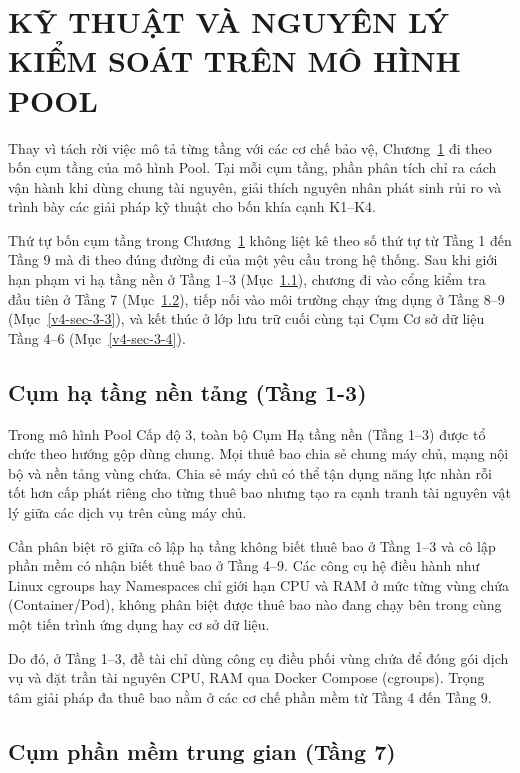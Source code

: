 \chapter{KỸ THUẬT VÀ NGUYÊN LÝ KIỂM SOÁT TRÊN MÔ HÌNH POOL}\label{v4-chapter-3}

Thay vì tách rời việc mô tả từng tầng với các cơ chế bảo vệ, Chương~\ref{v4-chapter-3} đi theo bốn cụm tầng của mô hình Pool. Tại mỗi cụm tầng, phần phân tích chỉ ra cách vận hành khi dùng chung tài nguyên, giải thích nguyên nhân phát sinh rủi ro và trình bày các giải pháp kỹ thuật cho bốn khía cạnh K1--K4.

Thứ tự bốn cụm tầng trong Chương~\ref{v4-chapter-3} không liệt kê theo số thứ tự từ Tầng 1 đến Tầng 9 mà đi theo đúng đường đi của một yêu cầu trong hệ thống. Sau khi giới hạn phạm vi hạ tầng nền ở Tầng 1--3 (Mục~\ref{v4-sec-3-1}), chương đi vào cổng kiểm tra đầu tiên ở Tầng 7 (Mục~\ref{v4-sec-3-2}), tiếp nối vào môi trường chạy ứng dụng ở Tầng 8--9 (Mục~\ref{v4-sec-3-3}), và kết thúc ở lớp lưu trữ cuối cùng tại Cụm Cơ sở dữ liệu Tầng 4--6 (Mục~\ref{v4-sec-3-4}).

\section{Cụm hạ tầng nền tảng (Tầng 1-3)}\label{v4-sec-3-1}

Trong mô hình Pool Cấp độ 3, toàn bộ Cụm Hạ tầng nền (Tầng 1--3) được tổ chức theo hướng gộp dùng chung. Mọi thuê bao chia sẻ chung máy chủ, mạng nội bộ và nền tảng vùng chứa. Chia sẻ máy chủ có thể tận dụng năng lực nhàn rỗi tốt hơn cấp phát riêng cho từng thuê bao nhưng tạo ra cạnh tranh tài nguyên vật lý giữa các dịch vụ trên cùng máy chủ.

Cần phân biệt rõ giữa cô lập hạ tầng không biết thuê bao ở Tầng 1--3 và cô lập phần mềm có nhận biết thuê bao ở Tầng 4--9. Các công cụ hệ điều hành như Linux cgroups hay Namespaces chỉ giới hạn CPU và RAM ở mức từng vùng chứa (Container/Pod), không phân biệt được thuê bao nào đang chạy bên trong cùng một tiến trình ứng dụng hay cơ sở dữ liệu.

Do đó, ở Tầng 1--3, đề tài chỉ dùng công cụ điều phối vùng chứa để đóng gói dịch vụ và đặt trần tài nguyên CPU, RAM qua Docker Compose (cgroups). Trọng tâm giải pháp đa thuê bao nằm ở các cơ chế phần mềm từ Tầng 4 đến Tầng 9.

\section{Cụm phần mềm trung gian (Tầng 7)}\label{v4-sec-3-2}

